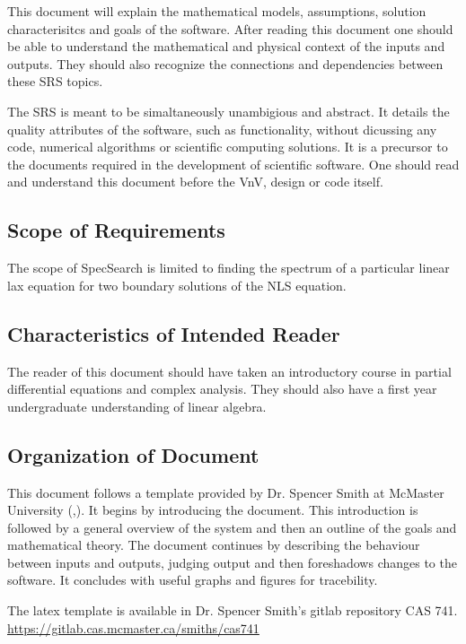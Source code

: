 \documentclass[12pt]{article}
\begin{document}
This document will explain the mathematical models, assumptions, 
solution characterisitcs and goals of the software. After reading this document 
one should be able to understand the mathematical and physical context of the 
inputs and outputs. They should also recognize the connections and 
dependencies between these SRS topics. 

The SRS is meant to be simaltaneously unambigious and abstract. It details the 
quality attributes of the software, such as functionality, 
without dicussing any code, numerical algorithms or scientific computing 
solutions. It is a precursor to the documents required in the development of 
scientific software. One should read and understand this document before the 
VnV, design or code itself. 

\subsection{Scope of Requirements} 

The scope of SpecSearch is limited to finding the spectrum of a particular 
linear lax equation for two boundary solutions of the NLS equation. 

\subsection{Characteristics of Intended Reader} 

The reader of this document should have taken an introductory course 
in partial differential equations and complex analysis. They should also have a 
first year undergraduate understanding of linear algebra.

\subsection{Organization of Document}

This document follows a template provided by Dr. Spencer Smith at McMaster 
University (\cite{SmithAndLai2005},\cite{SmithEtAl2007}). It begins by 
introducing the document. This 
introduction is 
followed by a general overview of the system and then an outline of the goals 
and mathematical theory. The document continues by describing the behaviour 
between inputs 
and outputs, judging output and then foreshadows changes to the software. It 
concludes with useful graphs and figures for tracebility. 

The latex template is available in Dr. Spencer Smith's gitlab 
repository CAS 741. \url{https://gitlab.cas.mcmaster.ca/smiths/cas741}
\end{document}
